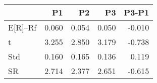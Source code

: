 \begin{tabular}{lrrrr}
\toprule
 & P1 & P2 & P3 & P3-P1 \\
\midrule
E[R]--Rf & 0.060 & 0.054 & 0.050 & -0.010 \\
t & 3.255 & 2.850 & 3.179 & -0.738 \\
Std & 0.160 & 0.165 & 0.136 & 0.119 \\
SR & 2.714 & 2.377 & 2.651 & -0.615 \\
\bottomrule
\end{tabular}
